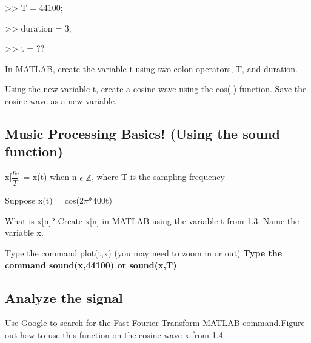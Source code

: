 \documentclass[11pt]{article}
\begin{document}
\begin{center}

>> T = 44100;



\end{center}

\begin{center}

>> duration = 3;



\end{center}

\begin{center}

>> t = ??


\end{center}

In MATLAB, create the variable t using two colon operators, T, and duration.

\vspace{5mm}
Using the new variable t, create a cosine wave using the cos( ) function. Save the cosine wave as a new variable.



\subsection{Music Processing Basics! (Using the sound function)}
\vspace{1.5mm}
\begin{center}
 x[$\dfrac{n}{T}$] = x(t) \hspace{5mm}     when n $\epsilon$ $\mathbb{Z}$,   where T is the sampling frequency

\vspace{3mm}
Suppose x(t) = cos(2$\pi$*400t)
\end{center}

\vspace{7mm}

What is x[n]?\newline
Create x[n] in MATLAB using the variable t from 1.3. Name the variable x.\newline

\vspace{4mm}
Type the command plot(t,x)   (you may need to zoom in or out)\newline
\textbf{Type the command sound(x,44100) or sound(x,T)}

\subsection{Analyze the signal}
Use Google to search for the Fast Fourier Transform MATLAB command.\newline Figure out how to use this function on the cosine wave x from 1.4.\newline
\end{document}
